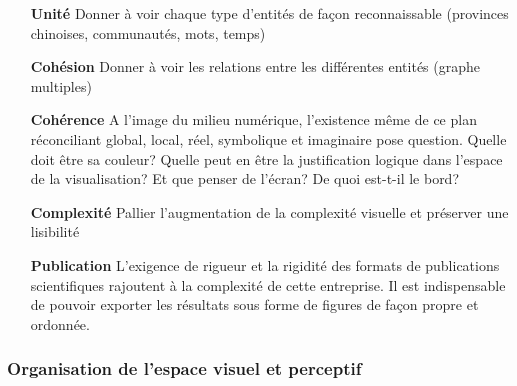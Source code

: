 \begin{itemize}
    \item[\textbf{Unité}] 
    Donner à voir chaque type d{\textquoteright}entités de fa\c{c}on reconnaissable (provinces chinoises, communautés, mots, temps)

    \item[\textbf{Cohésion}] 
    Donner à voir les relations entre les différentes entités (graphe multiples)

    \item[\textbf{Cohérence}]
    A l{\textquoteright}image du milieu numérique, l{\textquoteright}existence même de ce plan réconciliant global, local, réel, symbolique et imaginaire pose question. Quelle doit être sa couleur? Quelle peut en être la justification logique dans l{\textquoteright}espace de la visualisation? Et que penser de l{\textquoteright}écran? De quoi est-t-il le bord?

    \item[\textbf{Complexité}] 
    Pallier l{\textquoteright}augmentation de la complexité visuelle et préserver une lisibilité

    \item[\textbf{Publication}]
    L{\textquoteright}exigence de rigueur et la rigidité des formats de publications scientifiques rajoutent à la complexité de cette entreprise. Il est indispensable  de pouvoir exporter les résultats sous forme de figures de façon propre et ordonnée.
\end{itemize} 

\subsubsection{Organisation de l'espace visuel et perceptif}
\label{sec:viz}

